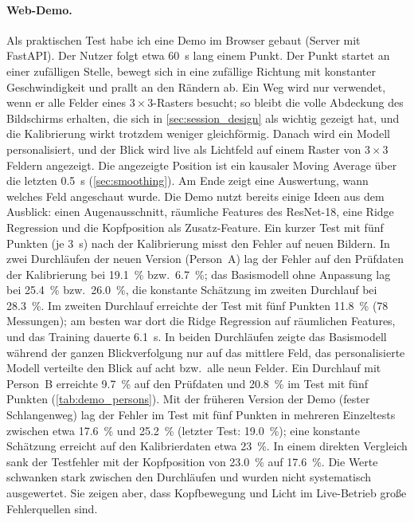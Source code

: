 \paragraph{Web-Demo.}
Als praktischen Test habe ich eine Demo im Browser gebaut (Server mit FastAPI).
Der Nutzer folgt etwa \SI{60}{\second} lang einem Punkt. Der Punkt startet an
einer zufälligen Stelle, bewegt sich in eine zufällige Richtung mit konstanter
Geschwindigkeit und prallt an den Rändern ab. Ein Weg wird nur verwendet, wenn
er alle Felder eines $3\times3$-Rasters besucht; so bleibt die volle Abdeckung
des Bildschirms erhalten, die sich in \cref{sec:session_design} als wichtig
gezeigt hat, und die Kalibrierung wirkt trotzdem weniger gleichförmig. Danach
wird ein Modell personalisiert, und der Blick wird live als Lichtfeld auf einem
Raster von $3\times3$ Feldern angezeigt. Die angezeigte Position ist ein
kausaler Moving Average über die letzten \SI{0,5}{\second}
(\cref{sec:smoothing}). Am Ende zeigt eine Auswertung, wann welches Feld
angeschaut wurde. Die Demo nutzt bereits einige Ideen aus dem Ausblick: einen
Augenausschnitt, räumliche Features des ResNet-18, eine Ridge Regression und die
Kopfposition als Zusatz-Feature. Ein kurzer Test mit fünf Punkten (je
\SI{3}{\second}) nach der Kalibrierung misst den Fehler auf neuen Bildern. In
zwei Durchläufen der neuen Version (Person~A) lag der Fehler auf den
Prüfdaten der Kalibrierung bei \SI{19,1}{\percent} bzw.\ \SI{6,7}{\percent};
das Basismodell ohne Anpassung lag bei \SI{25,4}{\percent} bzw.\
\SI{26,0}{\percent}, die konstante Schätzung im zweiten Durchlauf bei
\SI{28,3}{\percent}. Im zweiten Durchlauf erreichte der Test mit fünf Punkten
\SI{11,8}{\percent} (78 Messungen); am besten war dort die Ridge Regression auf
räumlichen Features, und das Training dauerte \SI{6,1}{\second}. In beiden
Durchläufen zeigte das Basismodell während der ganzen Blickverfolgung nur auf
das mittlere Feld, das personalisierte Modell verteilte den Blick auf acht bzw.\
alle neun Felder. Ein Durchlauf mit Person~B erreichte \SI{9,7}{\percent} auf
den Prüfdaten und \SI{20,8}{\percent} im Test mit fünf Punkten
(\cref{tab:demo_persons}). Mit der früheren Version der Demo (fester
Schlangenweg) lag der Fehler im Test mit fünf Punkten in mehreren Einzeltests zwischen etwa \SI{17,6}{\percent} und
\SI{25,2}{\percent} (letzter Test: \SI{19,0}{\percent}); eine konstante
Schätzung erreicht auf den Kalibrierdaten etwa \SI{23}{\percent}. In einem
direkten Vergleich sank der Testfehler mit der Kopfposition von
\SI{23,0}{\percent} auf \SI{17,6}{\percent}. Die Werte schwanken stark zwischen
den Durchläufen und wurden nicht systematisch ausgewertet. Sie zeigen aber, dass
Kopfbewegung und Licht im Live-Betrieb große Fehlerquellen sind.
